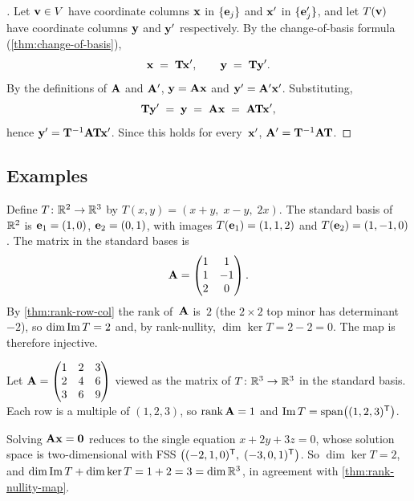 \begin{proof}[]
Let $\mathbf{v} \in V$ have coordinate columns $\mathbf{x}$ in
$\{\mathbf{e}_j\}$ and $\mathbf{x}'$ in $\{\mathbf{e}'_j\}$, and let
$T(\mathbf{v})$ have coordinate columns $\mathbf{y}$ and $\mathbf{y}'$
respectively. By the change-of-basis formula
(\cref{thm:change-of-basis}),
\[
  \mathbf{x} \;=\; \mathbf{T}\mathbf{x}', \qquad \mathbf{y} \;=\; \mathbf{T}\mathbf{y}'.
\]
By the definitions of $\mathbf{A}$ and $\mathbf{A}'$, $\mathbf{y} = \mathbf{A}\mathbf{x}$
and $\mathbf{y}' = \mathbf{A}' \mathbf{x}'$. Substituting,
\[
  \mathbf{T}\mathbf{y}' \;=\; \mathbf{y} \;=\; \mathbf{A}\mathbf{x} \;=\; \mathbf{A}\mathbf{T}\mathbf{x}',
\]
hence $\mathbf{y}' = \mathbf{T}^{-1}\mathbf{A}\mathbf{T}\mathbf{x}'$. Since this
holds for every~$\mathbf{x}'$, $\mathbf{A}' = \mathbf{T}^{-1}\mathbf{A}\mathbf{T}$.
\end{proof}

\subsection*{Examples}

\begin{example}
\label{ex:matrix-of-linear-map}
Define $T \colon \mathbb{R}^2 \to \mathbb{R}^3$ by
$T(x, y) = (x + y,\; x - y,\; 2x)$. The standard basis of~$\mathbb{R}^2$ is
$\mathbf{e}_1 = (1, 0)$, $\mathbf{e}_2 = (0, 1)$, with images
$T(\mathbf{e}_1) = (1, 1, 2)$ and $T(\mathbf{e}_2) = (1, -1, 0)$. The
matrix in the standard bases is
\[
  \mathbf{A} = \begin{pmatrix} 1 & 1 \\ 1 & -1 \\ 2 & 0 \end{pmatrix}.
\]
By \cref{thm:rank-row-col} the rank of~$\mathbf{A}$ is~$2$ (the
$2 \times 2$ top minor has determinant $-2$), so
$\dim \operatorname{Im} T = 2$ and, by rank-nullity,
$\dim \ker T = 2 - 2 = 0$. The map is therefore injective.
\end{example}

\begin{example}
\label{ex:rank-nullity-numeric}
Let $\mathbf{A} = \begin{pmatrix} 1 & 2 & 3 \\ 2 & 4 & 6 \\ 3 & 6 & 9 \end{pmatrix}$
viewed as the matrix of $T \colon \mathbb{R}^3 \to \mathbb{R}^3$ in the standard
basis. Each row is a multiple of $(1, 2, 3)$, so $\operatorname{rank} \mathbf{A} = 1$
and $\operatorname{Im} T = \operatorname{span}\bigl((1, 2, 3)^{\mathsf{T}}\bigr)$.

Solving $\mathbf{A}\mathbf{x} = \mathbf{0}$ reduces to the single equation
$x + 2y + 3z = 0$, whose solution space is two-dimensional with FSS
$\bigl((-2, 1, 0)^{\mathsf{T}},\; (-3, 0, 1)^{\mathsf{T}}\bigr)$. So $\dim \ker T = 2$, and
$\dim \operatorname{Im} T + \dim \ker T = 1 + 2 = 3 = \dim \mathbb{R}^3$, in agreement with
\cref{thm:rank-nullity-map}.
\end{example}

